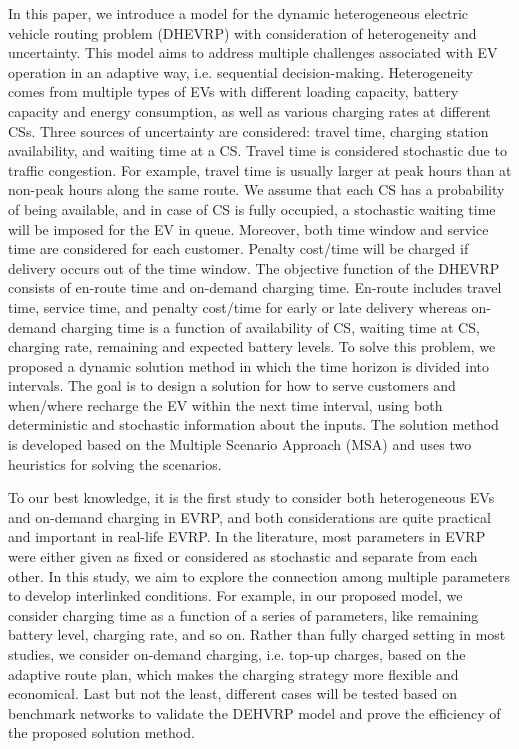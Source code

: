 \documentclass[11pt]{article}
\begin{document}
In this paper, we introduce a model for the dynamic heterogeneous electric vehicle routing problem (DHEVRP) with consideration of heterogeneity and uncertainty. This model aims to address multiple challenges associated with EV operation in an adaptive way, i.e. sequential decision-making. Heterogeneity comes from multiple types of EVs with different loading capacity, battery capacity and energy consumption, as well as various charging rates at different CSs. Three sources of uncertainty are considered: travel time, charging station availability, and waiting time at a CS. Travel time is considered stochastic due to traffic congestion. For example, travel time is usually larger at peak hours than at non-peak hours along the same route. We assume that each CS has a probability of being available, and in case of CS is fully occupied, a stochastic waiting time will be imposed for the EV in queue. Moreover, both time window and service time are considered for each customer. Penalty cost/time will be charged if delivery occurs out of the time window. The objective function of the DHEVRP consists of en-route time and on-demand charging time. En-route includes travel time, service time, and penalty cost/time for early or late delivery whereas on-demand charging time is a function of availability of CS, waiting time at CS, charging rate, remaining and expected battery levels. To solve this problem, we proposed a dynamic solution method in which the time horizon is divided into intervals. The goal is to design a solution for how to serve customers and when/where recharge the EV within the next time interval, using both deterministic and stochastic information about the inputs. The solution method is developed based on the Multiple Scenario Approach (MSA) \citep{Bent2004} and uses two heuristics for solving the scenarios.

To our best knowledge, it is the first study to consider both heterogeneous EVs and on-demand charging in EVRP, and both considerations are quite practical and important in real-life EVRP. In the literature, most parameters in EVRP were either given as fixed or considered as stochastic and separate from each other. In this study, we aim to explore the connection among multiple parameters to develop interlinked conditions. For example, in our proposed model, we consider charging time as a function of a series of parameters, like remaining battery level, charging rate, and so on. Rather than fully charged setting in most studies, we consider on-demand charging, i.e. top-up charges, based on the adaptive route plan, which makes the charging strategy more flexible and economical. Last but not the least, different cases will be tested based on benchmark networks to validate the DEHVRP model and prove the efficiency of the proposed solution method.
\end{document}
